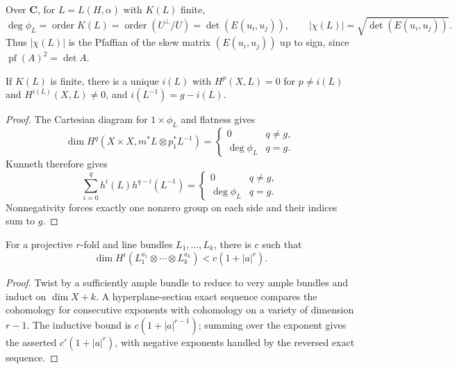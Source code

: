 \begin{remark}
\label{mumford-source-pfaffian-degree}
Over $\mathbf C$, for $L=L(H,\alpha)$ with $K(L)$ finite,
\[
 \deg\phi_L=\operatorname{order}K(L)
 =\operatorname{order}(U^\perp/U)=\det(E(u_i,u_j)),
 \qquad |\chi(L)|=\sqrt{\det(E(u_i,u_j))}.
\]
Thus $|\chi(L)|$ is the Pfaffian of the skew matrix $(E(u_i,u_j))$ up to
sign, since $\operatorname{pf}(A)^2=\det A$.
\end{remark}

\begin{theorem}
\label{mumford-thm-line-bundle-index}
If $K(L)$ is finite, there is a unique $i(L)$ with
$H^p(X,L)=0$ for $p\ne i(L)$ and $H^{i(L)}(X,L)\ne0$, and
$i(L^{-1})=g-i(L)$.
\end{theorem}
\begin{proof}
The Cartesian diagram for $1\times\phi_L$ and flatness gives
\[
\dim H^q(X\times X,m^*L\otimes p_1^*L^{-1})=
\begin{cases}0&q\ne g,\\\deg\phi_L&q=g.\end{cases}
\]
Kunneth therefore gives
\[
\sum_{i=0}^qh^i(L)h^{q-i}(L^{-1})=
\begin{cases}0&q\ne g,\\\deg\phi_L&q=g.\end{cases}
\]
Nonnegativity forces exactly one nonzero group on each side and their
indices sum to $g$.
\end{proof}

\begin{lemma}
\label{mumford-lem-index-growth}
For a projective $r$-fold and line bundles $L_1,\ldots,L_k$, there is $c$
such that
\[
\dim H^i(L_1^{a_1}\otimes\cdots\otimes L_k^{a_k})
<c(1+|a|^r).
\]
\end{lemma}
\begin{proof}
Twist by a sufficiently ample bundle to reduce to very ample bundles and
induct on $\dim X+k$. A hyperplane-section exact sequence compares the
cohomology for consecutive exponents with cohomology on a variety of
dimension $r-1$. The inductive bound is $c(1+|a|^{r-1})$; summing over the
exponent gives the asserted $c'(1+|a|^r)$, with negative exponents handled
by the reversed exact sequence.
\end{proof}


